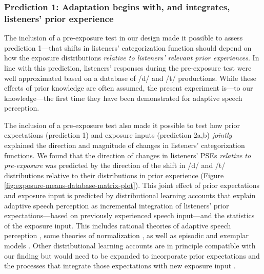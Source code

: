 \documentclass[
  11pt,
  man,mask,floatsintext]{apa6}
\begin{document}
\subsubsection{Prediction 1: Adaptation begins with, and integrates, listeners' prior experience}\label{prediction-1-adaptation-begins-with-and-integrates-listeners-prior-experience}

The inclusion of a pre-exposure test in our design made it possible to assess prediction 1---that shifts in listeners' categorization function should depend on how the exposure distributions \emph{relative to listeners' relevant prior experiences}. In line with this prediction, listeners' responses during the pre-exposure test were well approximated based on a database of /d/ and /t/ productions. While these effects of prior knowledge are often assumed, the present experiment is---to our knowledge---the first time they have been demonstrated for adaptive speech perception.

The inclusion of a pre-exposure test also made it possible to test how prior expectations (prediction 1) and exposure inputs (prediction 2a,b) \emph{jointly} explained the direction and magnitude of changes in listeners' categorization functions. We found that the direction of changes in listeners' PSEs \emph{relative to pre-exposure} was predicted by the direction of the shift in /d/ and /t/ distributions relative to their distributions in prior experience (Figure \ref{fig:exposure-means-database-matrix-plot}). This joint effect of prior expectations and exposure input is predicted by distributional learning accounts that explain adaptive speech perception as incremental integration of listeners' prior expectations---based on previously experienced speech input---and the statistics of the exposure input. This includes rational theories of adaptive speech perception \autocites[e.g., the ideal adaptor framework,][]{kleinschmidt-jaeger2015,kleinschmidt-jaeger2016}, some theories of normalization \autocite[e.g., the probabilistic sliding template model,][]{nearey-assmann2007}, as well as episodic \autocite{goldinger1998} and exemplar models \autocite{johnson1997}. Other distributional learning accounts are in principle compatible with our finding but would need to be expanded to incorporate prior expectations and the processes that integrate those expectations with new exposure input \autocites[e.g.,][]{bejjanki2011,mcmurray-jongman2011}[see discussion in][]{persson2024,xie2023}.
\end{document}
